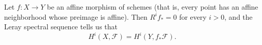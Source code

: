 \documentclass[12pt]{article}
\begin{document}
Let $f:X\to Y$ be an affine morphism of schemes (that is, every point has an affine neighborhood whose preimage is affine). Then $R^if_*=0$ for every $i>0$, and the Leray spectral sequence tells us that
\[
H^i(X,\mathcal{F}) = H^i(Y,f_*\mathcal{F}).
\]
\end{document}
